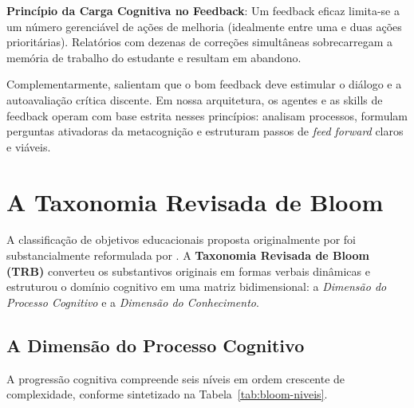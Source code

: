 \begin{conceitochave}
\textbf{Princ{\'i}pio da Carga Cognitiva no Feedback}: Um feedback eficaz limita-se a um n{\'u}mero gerenci{\'a}vel de a{\c c}{\~o}es de melhoria (idealmente entre uma e duas a{\c c}{\~o}es priorit{\'a}rias). Relat{\'o}rios com dezenas de corre{\c c}{\~o}es simult{\^a}neas sobrecarregam a mem{\'o}ria de trabalho do estudante e resultam em abandono.
\end{conceitochave}

Complementarmente,  salientam que o bom feedback deve estimular o di{\'a}logo e a autoavalia{\c c}{\~a}o cr{\'i}tica discente. Em nossa arquitetura, os agentes e as skills de feedback operam com base estrita nesses princ{\'i}pios: analisam processos, formulam perguntas ativadoras da metacogni{\c c}{\~a}o e estruturam passos de \emph{feed forward} claros e vi{\'a}veis.

\section{A Taxonomia Revisada de Bloom}

A classifica{\c c}{\~a}o de objetivos educacionais proposta originalmente por  foi substancialmente reformulada por . A \textbf{Taxonomia Revisada de Bloom (TRB)} converteu os substantivos originais em formas verbais din{\^a}micas e estruturou o dom{\'i}nio cognitivo em uma matriz bidimensional: a \emph{Dimens{\~a}o do Processo Cognitivo} e a \emph{Dimens{\~a}o do Conhecimento}.

\subsection{A Dimens{\~a}o do Processo Cognitivo}

A progress{\~a}o cognitiva compreende seis n{\'i}veis em ordem crescente de complexidade, conforme sintetizado na Tabela~\ref{tab:bloom-niveis}.

